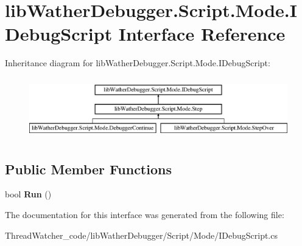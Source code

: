 \hypertarget{interfacelib_wather_debugger_1_1_script_1_1_mode_1_1_i_debug_script}{\section{lib\+Wather\+Debugger.\+Script.\+Mode.\+I\+Debug\+Script Interface Reference}
\label{interfacelib_wather_debugger_1_1_script_1_1_mode_1_1_i_debug_script}
}
Inheritance diagram for lib\+Wather\+Debugger.\+Script.\+Mode.\+I\+Debug\+Script\+:\begin{figure}[H]
\begin{center}
\leavevmode
\includegraphics[height=2.692308cm]{interfacelib_wather_debugger_1_1_script_1_1_mode_1_1_i_debug_script}
\end{center}
\end{figure}
\subsection*{Public Member Functions}
\begin{DoxyCompactItemize}
\item 
\hypertarget{interfacelib_wather_debugger_1_1_script_1_1_mode_1_1_i_debug_script_ab885bb76a1aaef6388ad228ec5d0dd9c}{bool {\bfseries Run} ()}\label{interfacelib_wather_debugger_1_1_script_1_1_mode_1_1_i_debug_script_ab885bb76a1aaef6388ad228ec5d0dd9c}

\end{DoxyCompactItemize}


The documentation for this interface was generated from the following file\+:\begin{DoxyCompactItemize}
\item 
Thread\+Watcher\+\_\+code/lib\+Wather\+Debugger/\+Script/\+Mode/I\+Debug\+Script.\+cs\end{DoxyCompactItemize}

